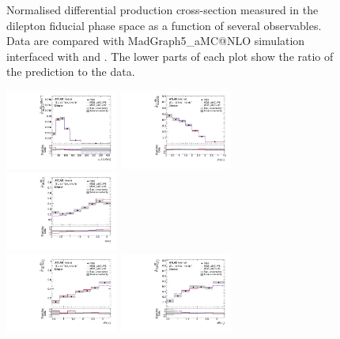 \begin{figure}[ht]
  \caption{Normalised differential \tty production cross-section measured in the dilepton fiducial phase space as a function of several observables. Data are compared with MadGraph5\_aMC@NLO simulation interfaced with \PYTHIA[8] and \HERWIG[7]. The lower parts of each plot show the ratio of the prediction to the data.}
  \label{fig:tty_prod_diff_DL1_norm}
\end{figure}
\FloatBarrier


\begin{figure}[ht]
  \centering
  \includegraphics[width=0.33\textwidth]{figures/diff_xsec/normalized-unfolded-distributions/tty_prod_dilep/DL_tty_prod_ptll_unfolded_normalized.pdf}%
  \includegraphics[width=0.33\textwidth]{figures/diff_xsec/normalized-unfolded-distributions/tty_prod_dilep/DL_tty_prod_dEtall_unfolded_normalized.pdf}%
  \includegraphics[width=0.33\textwidth]{figures/diff_xsec/normalized-unfolded-distributions/tty_prod_dilep/DL_tty_prod_dPhill_unfolded_normalized.pdf}\\
  \includegraphics[width=0.33\textwidth]{figures/diff_xsec/normalized-unfolded-distributions/tty_prod_dilep/DL_tty_prod_drphl1_unfolded_normalized.pdf}%
  \includegraphics[width=0.33\textwidth]{figures/diff_xsec/normalized-unfolded-distributions/tty_prod_dilep/DL_tty_prod_drphl2_unfolded_normalized.pdf}%

\end{figure}
